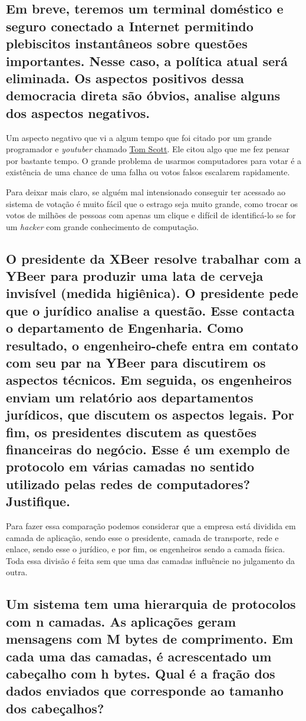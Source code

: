 \subsection{Em breve, teremos um terminal doméstico e seguro conectado a
Internet permitindo plebiscitos instantâneos sobre questões
importantes. Nesse caso, a política atual será eliminada. Os
aspectos positivos dessa democracia direta são óbvios, analise
alguns dos aspectos negativos.}

    Um aspecto negativo que vi a algum tempo que foi citado
    por um grande programador e \emph{youtuber} chamado 
    \hyperlink{https://www.youtube.com/c/TomScottGo}{Tom Scott}.
    Ele citou algo que me fez pensar por bastante tempo.
    O grande problema de usarmos computadores para votar é a existência
    de uma chance de uma falha ou votos falsos escalarem rapidamente\cite{WEBSITE:1}. 

    Para deixar mais claro,
    se alguém mal intensionado conseguir ter acessado ao sistema de votação
    é muito fácil que o estrago seja muito grande, como trocar os votos de milhões
    de pessoas com apenas um clique e difícil de identificá-lo se for um 
    \emph{hacker} com grande conhecimento de computação.

\subsection{O presidente da XBeer resolve trabalhar com a YBeer para produzir
uma lata de cerveja invisível (medida higiênica). O presidente pede
que o jurídico analise a questão. Esse contacta o departamento de
Engenharia. Como resultado, o engenheiro-chefe entra em contato
com seu par na YBeer para discutirem os aspectos técnicos. Em
seguida, os engenheiros enviam um relatório aos departamentos
jurídicos, que discutem os aspectos legais. Por fim, os presidentes
discutem as questões financeiras do negócio. Esse é um exemplo de
protocolo em várias camadas no sentido utilizado pelas redes de
computadores? Justifique.}

Para fazer essa comparação podemos considerar que a empresa está dividida em 
camada de aplicação, sendo esse o presidente, camada de transporte, rede e enlace, sendo esse
o jurídico, e por fim, os engenheiros sendo a camada física. Toda essa divisão é feita
sem que uma das camadas influêncie no julgamento da outra.

\subsection{Um sistema tem uma hierarquia de protocolos com n camadas. As
aplicações geram mensagens com M bytes de comprimento. Em
cada uma das camadas, é acrescentado um cabeçalho com h bytes.
Qual é a fração dos dados enviados que corresponde ao tamanho
dos cabeçalhos?}

